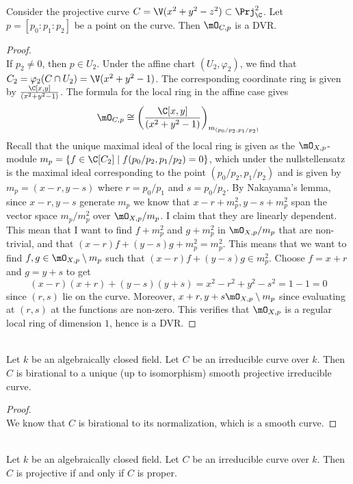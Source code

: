 \documentclass[a4paper]{article}
\begin{document}
\begin{eg}{}{}\\
Consider the projective curve $C=\V(x^2+y^2-z^2)\subset\Prj_\C^2$. Let $p=[p_0:p_1:p_2]$ be a point on the curve. Then $\mO_{C,p}$ is a DVR. 
\begin{proof}\\
If $p_2\neq 0$, then $p\in U_2$. Under the affine chart $(U_2,\varphi_2)$, we find that $C_2=\varphi_2(C\cap U_2)=\V(x^2+y^2-1)$. The corresponding coordinate ring is given by $\frac{\C[x,y]}{(x^2+y^2-1)}$. The formula for the local ring in the affine case gives $$\mO_{C,p}\cong\left(\frac{\C[x,y]}{(x^2+y^2-1)}\right)_{m_{(p_0/p_2,p_1/p_2)}}$$ Recall that the unique maximal ideal of the local ring is given as the $\mO_{X,p}$-module $m_p=\{f\in\C[C_2]\;|\;f(p_0/p_2,p_1/p_2)=0\}$, which under the nullstellensatz is the maximal ideal corresponding to the point $(p_0/p_2,p_1/p_2)$ and is given by $m_p=(x-r,y-s)$ where $r=p_0/p_1$ and $s=p_0/p_2$. By Nakayama's lemma, since $x-r,y-s$ generate $m_p$ we know that $x-r+m_p^2,y-s+m_p^2$ span the vector space $m_p/m_p^2$ over $\mO_{X,p}/m_p$. I claim that they are linearly dependent. This mean that I want to find $f+m_p^2$ and $g+m_p^2$ in $\mO_{X,p}/m_p$ that are non-trivial, and that $(x-r)f+(y-s)g+m_p^2=m_p^2$. This means that we want to find $f,g\in\mO_{X,p}\setminus m_p$ such that $(x-r)f+(y-s)g\in m_p^2$. Choose $f=x+r$ and $g=y+s$ to get $$(x-r)(x+r)+(y-s)(y+s)=x^2-r^2+y^2-s^2=1-1=0$$ since $(r,s)$ lie on the curve. Moreover, $x+r,y+s\mO_{X,p}\setminus m_p$ since evaluating at $(r,s)$ at the functions are non-zero. This verifies that $\mO_{X,p}$ is a regular local ring of dimension $1$, hence is a DVR. 
\end{proof}
\end{eg}

\begin{prp}{}{}\\
Let $k$ be an algebraically closed field. Let $C$ be an irreducible curve over $k$. Then $C$ is birational to a unique (up to isomorphism) smooth projective irreducible curve. 
\begin{proof}\\
We know that $C$ is birational to its normalization, which is a smooth curve. 
\end{proof}
\end{prp}

\begin{prp}{}{}\\
Let $k$ be an algebraically closed field. Let $C$ be an irreducible curve over $k$. Then $C$ is projective if and only if $C$ is proper. 
\end{prp}
\end{document}
